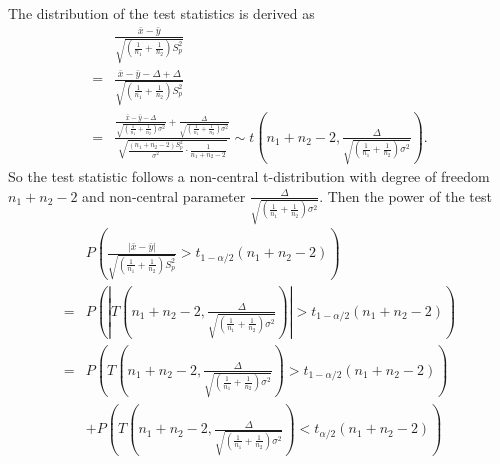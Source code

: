 \documentclass[a4paper,12pt]{article}
\begin{document}
The distribution of the test statistics is derived as
\[
  \begin{aligned}
    & \frac{
      \bar{x} - \bar{y}
      }{
      \sqrt{
      \left(\frac{1}{n_1} + \frac{1}{n_2}\right)
      S_p^2
      }
      }    \\
    =& \frac{
       \bar{x} - \bar{y}
       - \Delta
       + \Delta
       }{
       \sqrt{
       \left(\frac{1}{n_1} + \frac{1}{n_2}\right)
       S_p^2
       }
       }    \\
    =& \frac{
       \frac{
       \bar{x} - \bar{y} - \Delta
       }{
       \sqrt{\left(\frac{1}{n_1} + \frac{1}{n_2}\right)\sigma^2}
       }
       + \frac{\Delta}{\sqrt{\left(\frac{1}{n_1} + \frac{1}{n_2}\right)\sigma^2}}    
       }{
       \sqrt{
       \frac{\left(n_1 + n_2 - 2\right)S_p^2}{\sigma^2}
       \cdot \frac{1}{n_1 + n_2 - 2}
       }
       }
       \sim t(
       n_1 + n_2 - 2,
       \frac{\Delta}{\sqrt{\left(\frac{1}{n_1} + \frac{1}{n_2}\right)\sigma^2}}
       )
       .
  \end{aligned}
\]
So the test statistic follows a non-central t-distribution with degree of freedom $n_1 + n_2 - 2$ and non-central parameter $\frac{\Delta}{\sqrt{\left(\frac{1}{n_1} + \frac{1}{n_2}\right)\sigma^2}}$. Then the power of the test
\begin{equation}
  \label{eq:power_equation_two_sample_variance_equal_but_unknown}
    \begin{aligned}
    & P\left(
      \frac{
      \left|\bar{x} - \bar{y}\right|
      }{
      \sqrt{
      \left(\frac{1}{n_1} + \frac{1}{n_2}\right)
      S_p^2
      }
      }
      > t_{1 - \alpha / 2}\left(n_1 + n_2 - 2\right)
      \right)    \\
    =& P\left(
       \left|
       T{\left(
       n_1 + n_2 - 2,
       \frac{\Delta}{\sqrt{\left(\frac{1}{n_1} + \frac{1}{n_2}\right)\sigma^2}}
       \right)}
       \right|
       > t_{1 - \alpha / 2}\left(n_1 + n_2 - 2\right)
       \right)    \\
    =& P\left(
       T{\left(
       n_1 + n_2 - 2,
       \frac{\Delta}{\sqrt{\left(\frac{1}{n_1} + \frac{1}{n_2}\right)\sigma^2}}
       \right)}
       > t_{1 - \alpha / 2}\left(n_1 + n_2 - 2\right)
       \right)    \\
    &+ P\left(
       T{\left(
       n_1 + n_2 - 2,
       \frac{\Delta}{\sqrt{\left(\frac{1}{n_1} + \frac{1}{n_2}\right)\sigma^2}}
       \right)}
       < t_{\alpha / 2}\left(n_1 + n_2 - 2\right)
       \right)    \\
  \end{aligned}
\end{equation}
\end{document}
